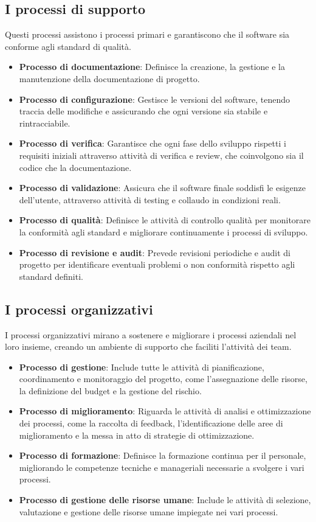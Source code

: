 \subsection{I processi di supporto}
Questi processi assistono i processi primari e garantiscono che il software sia conforme agli standard di qualità.
\begin{itemize}
    \item \textbf{Processo di documentazione}: Definisce la creazione, la gestione e la manutenzione della documentazione di progetto.
    \item \textbf{Processo di configurazione}: Gestisce le versioni del software, tenendo traccia delle modifiche e assicurando che ogni versione sia stabile e rintracciabile.
    \item \textbf{Processo di verifica}: Garantisce che ogni fase dello sviluppo rispetti i requisiti iniziali attraverso attività di verifica e review, che coinvolgono sia il codice che la documentazione.
    \item \textbf{Processo di validazione}: Assicura che il software finale soddisfi le esigenze dell'utente, attraverso attività di testing e collaudo in condizioni reali.
    \item \textbf{Processo di qualità}: Definisce le attività di controllo qualità per monitorare la conformità agli standard e migliorare continuamente i processi di sviluppo.
    \item \textbf{Processo di revisione e audit}: Prevede revisioni periodiche e audit di progetto per identificare eventuali problemi o non conformità rispetto agli standard definiti.
\end{itemize}

\subsection{I processi organizzativi}
I processi organizzativi mirano a sostenere e migliorare i processi aziendali nel loro insieme, creando un ambiente di supporto che faciliti l'attività dei team.
\begin{itemize}
    \item \textbf{Processo di gestione}: Include tutte le attività di pianificazione, coordinamento e monitoraggio del progetto, come l'assegnazione delle risorse, la definizione del budget e la gestione del rischio.
    \item \textbf{Processo di miglioramento}: Riguarda le attività di analisi e ottimizzazione dei processi, come la raccolta di feedback, l'identificazione delle aree di miglioramento e la messa in atto di strategie di ottimizzazione.
    \item \textbf{Processo di formazione}: Definisce la formazione continua per il personale, migliorando le competenze tecniche e manageriali necessarie a svolgere i vari processi.
    \item \textbf{Processo di gestione delle risorse umane}: Include le attività di selezione, valutazione e gestione delle risorse umane impiegate nei vari processi.
\end{itemize}

